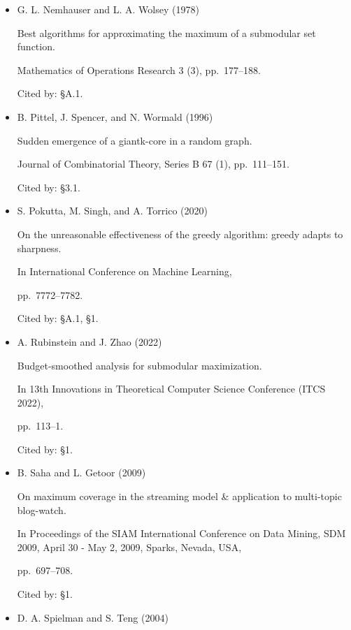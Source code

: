 \begin{itemize}
Cited by: §1.



\item[] [22]
G. L. Nemhauser and L. A. Wolsey (1978)

Best algorithms for approximating the maximum of a submodular set function.

Mathematics of Operations Research 3 (3), pp. 177–188.

Cited by: §A.1.



\item[] [23]
B. Pittel, J. Spencer, and N. Wormald (1996)

Sudden emergence of a giantk-core in a random graph.

Journal of Combinatorial Theory, Series B 67 (1), pp. 111–151.

Cited by: §3.1.



\item[] [24]
S. Pokutta, M. Singh, and A. Torrico (2020)

On the unreasonable effectiveness of the greedy algorithm: greedy adapts to sharpness.

In International Conference on Machine Learning,

pp. 7772–7782.

Cited by: §A.1,
§1.



\item[] [25]
A. Rubinstein and J. Zhao (2022)

Budget-smoothed analysis for submodular maximization.

In 13th Innovations in Theoretical Computer Science Conference (ITCS 2022),

pp. 113–1.

Cited by: §1.



\item[] [26]
B. Saha and L. Getoor (2009)

On maximum coverage in the streaming model \& application to multi-topic blog-watch.

In Proceedings of the SIAM International Conference on Data Mining,
SDM 2009, April 30 - May 2, 2009, Sparks, Nevada, USA,

pp. 697–708.

Cited by: §1.



\item[] [27]
D. A. Spielman and S. Teng (2004)


\end{itemize}
